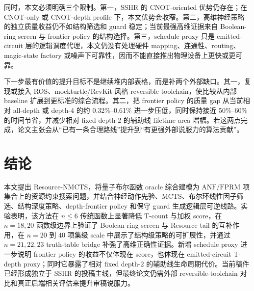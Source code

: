\documentclass[UTF8,fontset=macnew,11pt]{ctexart}
\newcommand{\method}{Resource-NMCTS}
\newcommand{\screen}{Boolean-ring screen}
\newcommand{\anf}{\ensuremath{\mathrm{ANF}}}
\newcommand{\fprm}{\ensuremath{\mathrm{FPRM}}}
\newcommand{\mcts}{\ensuremath{\mathrm{MCTS}}}
\begin{document}
同时，本文必须明确三个限制。第一，SSHR 的 CNOT-oriented 优势仍存在；在 CNOT-only 或 CNOT-depth profile 下，本文优势会收窄。第二，高维神经策略的独立质量收益仍不如结构筛选和 guard 稳定；当前最强高维证据来自 Boolean-ring screen 与 frontier policy 的结构选择。第三，schedule proxy 只是 emitted-circuit 层的逻辑调度代理，本文仍没有处理硬件 mapping、连通性、routing、magic-state factory 或噪声下可靠性，因而不能直接推出物理设备上更快或更可靠。

下一步最有价值的提升目标不是继续堆内部表格，而是补两个外部缺口。其一，复现或接入 ROS、mockturtle/RevKit 风格 reversible-toolchain，使比较从内部 baseline 扩展到更标准的综合流程。其二，把 frontier policy 的质量 gap 从当前相对 all-depth 或 depth-4 的约 0.32\%--0.61\% 进一步压低，同时保持接近 50\%--60\% 的时间节省，并减少相对 fixed depth-2 的辅助线 lifetime area 增幅。若这两点完成，论文主张会从“已有一条合理路线”提升到“有更强外部说服力的算法贡献”。

\section{结论}

本文提出 \method{}，将量子布尔函数 oracle 综合建模为 \anf{}/\fprm{} 项集合上的资源约束搜索问题，并结合神经动作先验、\mcts{}、布尔环线性因子筛选、结构深度策略、depth-frontier policy 和保守 guard 生成逻辑层可逆线路。实验表明，该方法在 $n\leq6$ 传统函数上显著降低 T-count 与加权 score，在 $n=18,20$ 函数级边界上验证了 \screen{} 与 Resource tail 的互补作用，在 $n=20$ 到 $40$ 项集级 scale 中展示了结构级策略的可扩展性，并通过 $n=21,22,23$ truth-table bridge 补强了高维正确性证据。新增 schedule proxy 进一步说明 frontier policy 的收益不仅体现在 score，也体现在 emitted-circuit T-depth proxy；同时它暴露了相对 fixed depth-2 的辅助线生命周期代价。当前稿件已经形成独立于 SSHR 的投稿主线，但最终论文仍需外部 reversible-toolchain 对比和真正后端相关评估来提升审稿说服力。
\end{document}
